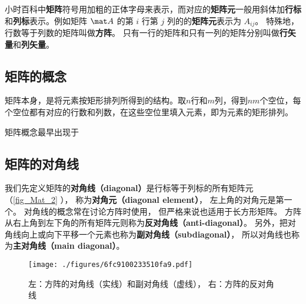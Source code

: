 
\begin{issues}
\end{issues}



小时百科中\textbf{矩阵}符号用加粗的正体字母来表示，而对应的\textbf{矩阵元}一般用斜体加\textbf{行标}和\textbf{列标}表示。例如矩阵 $\mat A$ 的第 $i$ 行第 $j$ 列的的\textbf{矩阵元}表示为 $A_{ij}$。 特殊地， 行数等于列数的矩阵叫做\textbf{方阵}。 只有一行的矩阵和只有一列的矩阵分别叫做\textbf{行矢量}和\textbf{列矢量}。



\subsection{矩阵的概念}



矩阵本身，是将元素按矩形排列所得到的结构。取$n$行和$m$列，得到$nm$个空位，每个空位都有对应的行数和列数，在这些空位里填入元素，即为元素的矩形排列。

矩阵概念最早出现于





\subsection{矩阵的对角线}
我们先定义矩阵的\textbf{对角线（diagonal）}是行标等于列标的所有矩阵元（\autoref{fig_Mat_2} ）， 称为\textbf{对角元（diagonal element）}， 左上角的对角元是第一个。 对角线的概念常在讨论方阵时使用， 但严格来说也适用于长方形矩阵。 方阵从右上角到左下角的所有矩阵元则称为\textbf{反对角线（anti-diagonal）}。 另外，把对角线向上或向下平移一个元素也称为\textbf{副对角线（subdiagonal）}， 所以对角线也称为\textbf{主对角线（main diagonal）}。

\begin{figure}[ht]
\centering
\texttt{[image: ./figures/6fc9100233510fa9.pdf]}
\caption{左：方阵的对角线（实线）和副对角线（虚线）， 右：方阵的反对角线} \label{fig_Mat_2}
\end{figure}

